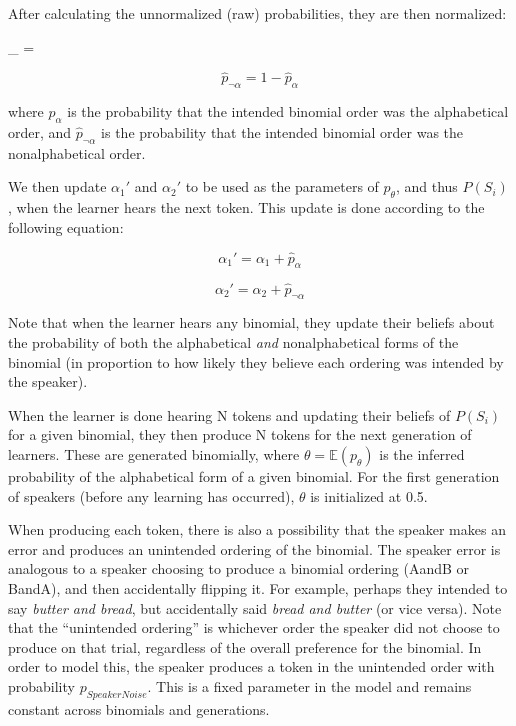 \documentclass[10pt, letterpaper]{article}
\begin{document}
After calculating the unnormalized (raw) probabilities, they are then
normalized:

\begin{myequation}%
\label{eq:phatalpha}
_{\alpha} =  %
\end{myequation}

\begin{equation}
\label{eq:phatnotalpha}
\hat{p}_{\neg\alpha} = 1 - \hat{p}_\alpha
\end{equation}

\noindent where \(\hat{p}_\alpha\) is the probability that the intended
binomial order was the alphabetical order, and \(\hat{p}_{\neg\alpha}\)
is the probability that the intended binomial order was the
nonalphabetical order.

We then update \(\alpha_1'\) and \(\alpha_2'\) to be used as the
parameters of \(p_\theta\), and thus \(P(S_i)\), when the learner hears
the next token. This update is done according to the following equation:

\begin{equation}
\label{eq:alpha1}
\alpha_1' = \alpha_1 + \hat{p}_\alpha
\end{equation}

\begin{equation}
\label{eq:alpha2}
\alpha_2' = \alpha_2 + \hat{p}_{\neg\alpha}
\end{equation}

Note that when the learner hears any binomial, they update their beliefs
about the probability of both the alphabetical \emph{and}
nonalphabetical forms of the binomial (in proportion to how likely they
believe each ordering was intended by the speaker).

When the learner is done hearing N tokens and updating their beliefs of
\(P(S_i)\) for a given binomial, they then produce N tokens for the next
generation of learners. These are generated binomially, where
\(\theta = \mathbb{E}(p_\theta)\) is the inferred probability of the
alphabetical form of a given binomial. For the first generation of
speakers (before any learning has occurred), \(\theta\) is initialized
at 0.5.

When producing each token, there is also a possibility that the speaker
makes an error and produces an unintended ordering of the binomial. The
speaker error is analogous to a speaker choosing to produce a binomial
ordering (AandB or BandA), and then accidentally flipping it. For
example, perhaps they intended to say \emph{butter and bread}, but
accidentally said \emph{bread and butter} (or vice versa). Note that the
``unintended ordering'' is whichever order the speaker did not choose to
produce on that trial, regardless of the overall preference for the
binomial. In order to model this, the speaker produces a token in the
unintended order with probability \(p_{SpeakerNoise}\). This is a fixed
parameter in the model and remains constant across binomials and
generations.
\end{document}
